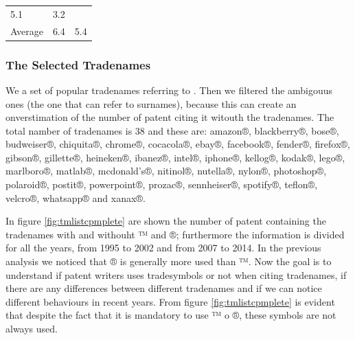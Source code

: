 \documentclass[]{book}
\begin{document}
\begin{longtable}[]{@{}lll@{}}
\begin{minipage}[t]{0.39\columnwidth}
5.1\strut
\end{minipage} & \begin{minipage}[t]{0.39\columnwidth}\raggedright\strut
3.2\strut
\end{minipage}\tabularnewline
\begin{minipage}[t]{0.13\columnwidth}\raggedright\strut
Average\strut
\end{minipage} & \begin{minipage}[t]{0.39\columnwidth}\raggedright\strut
6.4\strut
\end{minipage} & \begin{minipage}[t]{0.39\columnwidth}\raggedright\strut
5.4\strut
\end{minipage}\tabularnewline
\bottomrule
\end{longtable}

\subsubsection*{The Selected Tradenames}\label{the-selected-tradenames}

We a set of popular tradenames referring to
\citep{morris2016trademarks}. Then we filtered the ambigouus ones (the
one that can refer to surnames), because this can create an
onverstimation of the number of patent citing it witouth the tradenames.
The total namber of tradenames is 38 and these are: amazon®,
blackberry®, bose®, budweiser®, chiquita®, chrome®, cocacola®, ebay®,
facebook®, fender®, firefox®, gibson®, gillette®, heineken®, ibanez®,
intel®, iphone®, kellog®, kodak®, lego®, marlboro®, matlab®,
mcdonald's®, nitinol®, nutella®, nylon®, photoshop®, polaroid®, postit®,
powerpoint®, prozac®, sennheiser®, spotify®, teflon®, velcro®, whatsapp®
and xanax®.

In figure \ref{fig:tmlistcpmplete} are shown the number of patent
containing the tradenames with and withouht ™ and ®; furthermore the
information is divided for all the years, from 1995 to 2002 and from
2007 to 2014. In the previous analysis we noticed that ® is generally
more used than ™. Now the goal is to understand if patent writers uses
tradesymbols or not when citing tradenames, if there are any differences
between different tradenames and if we can notice different behaviours
in recent years. From figure \ref{fig:tmlistcpmplete} is evident that
despite the fact that it is mandatory to use ™ o ®, these symbols are
not always used.
\end{document}
